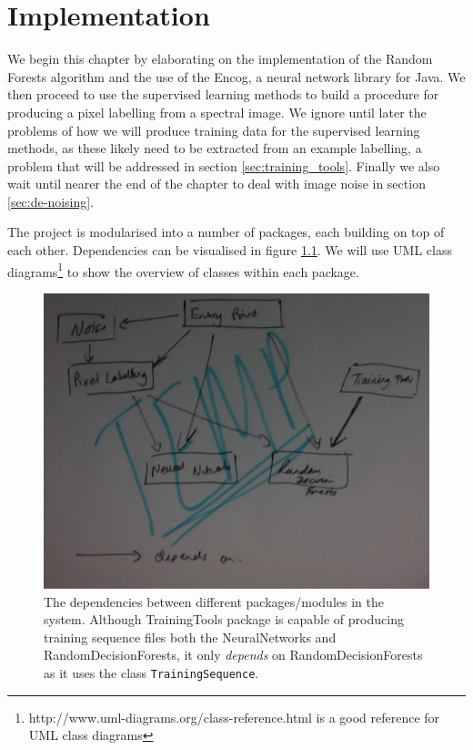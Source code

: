 \documentclass[12pt,twoside,notitlepage]{report}
\begin{document}
\chapter{Implementation}
    We begin this chapter by elaborating on the implementation of the Random Forests algorithm and the use of the Encog, a 
    neural network library for Java. We then proceed to use the supervised learning methods to build a procedure for 
    producing a pixel labelling from a spectral image. We ignore until later the problems of how we will produce 
    training data for the supervised learning methods, as these likely need to be extracted from an example labelling, 
    a problem that will be addressed in section \ref{sec:training_tools}. Finally we also wait until nearer the end of 
    the chapter to deal with image noise in section \ref{sec:de-noising}.

    The project is modularised into a number of packages, each building on top of each other. Dependencies can be 
    visualised in figure \ref{fig:package_dependencies}. We will use UML class diagrams\footnote{http://www.uml-diagrams.org/class-reference.html is a good reference for UML class diagrams} to show the 
    overview of classes within each package.

    \begin{figure}[H]
        \centering
        \includegraphics[scale=0.5]{package_dependencies}
        \caption{The dependencies between different packages/modules in the system. Although TrainingTools package is
        capable of producing training sequence files both the NeuralNetworks and RandomDecisionForests, it only 
        \textit{depends} on RandomDecisionForests as it uses the class \texttt{TrainingSequence}.}
        \label{fig:package_dependencies}
    \end{figure}
\end{document}
